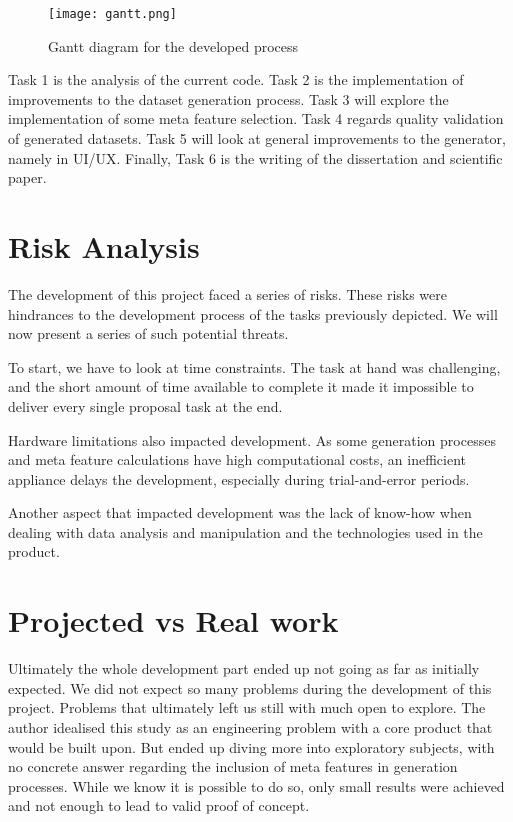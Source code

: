 \begin{figure}[h!]
    \begin{center}
      \leavevmode
      \texttt{[image: gantt.png]}
      \caption[Gantt diagram for the developed process]{Gantt diagram for the developed process}
      \label{fig:gantt}
    \end{center}
\end{figure}

Task 1 is the analysis of the current code. Task 2 is the implementation of improvements to the dataset generation process. Task 3 will explore the implementation of some meta feature selection. Task 4 regards quality validation of generated datasets. Task 5 will look at general improvements to the generator, namely in UI/UX. Finally, Task 6 is the writing of the dissertation and scientific paper.


\section{Risk Analysis}
The development of this project faced a series of risks. These risks were hindrances to the development process of the tasks previously depicted. We will now present a series of such potential threats. 

To start, we have to look at time constraints. The task at hand was challenging, and the short amount of time available to complete it made it impossible to deliver every single proposal task at the end.

Hardware limitations also impacted development. As some generation processes and meta feature calculations have high computational costs, an inefficient appliance delays the development, especially during trial-and-error periods. 

Another aspect that impacted development was the lack of know-how when dealing with data analysis and manipulation and the technologies used in the product.

\section{Projected vs Real work}
Ultimately the whole development part ended up not going as far as initially expected. We did not expect so many problems during the development of this project. Problems that ultimately left us still with much open to explore. The author idealised this study as an engineering problem with a core product that would be built upon. But ended up diving more into exploratory subjects, with no concrete answer regarding the inclusion of meta features in generation processes. While we know it is possible to do so, only small results were achieved and not enough to lead to valid proof of concept.


